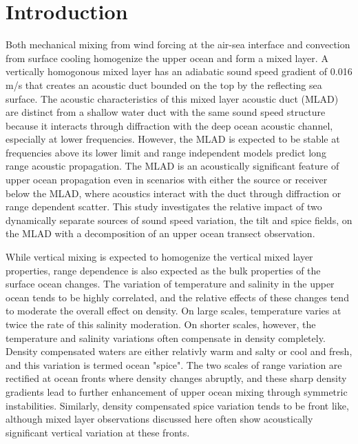 \documentclass[preprint,NumberedRefs]{JASA}
\begin{document}
\section{\label{sec:intro} Introduction}
Both mechanical mixing from wind forcing at the air-sea interface and convection from surface cooling homogenize the upper ocean and form a mixed layer\citep{cole2010seasonal}. A vertically homogonous mixed layer has an adiabatic sound speed gradient of 0.016 m/s that creates an acoustic duct bounded on the top by the reflecting sea surface. The acoustic characteristics of this mixed layer acoustic duct (MLAD) are distinct from a shallow water duct with the same sound speed structure because it interacts through diffraction with the deep ocean acoustic channel\citep{porter93}, especially at lower frequencies. However, the MLAD is expected to be stable at frequencies above its lower limit\citep{Urick1982Prop} and range independent models predict long range acoustic propagation. The MLAD is an acoustically significant feature of upper ocean propagation even in scenarios with either the source or receiver below the MLAD, where acoustics interact with the duct through diffraction or range dependent scatter\citep{colosi21}. This study investigates the relative impact of two dynamically separate sources of sound speed variation, the tilt and spice fields, on the MLAD with a decomposition of an upper ocean transect observation.

While vertical mixing is expected to homogenize the vertical mixed layer properties, range dependence is also expected as the bulk properties of the surface ocean changes\citep{ferrari2000}. The variation of temperature and salinity in the upper ocean tends to be highly correlated, and the relative effects of these changes tend to moderate the overall effect on density. On large scales, temperature varies at twice the rate of this salinity moderation. On shorter scales, however, the temperature and salinity variations often compensate in density completely. Density compensated waters are either relativly warm and salty or cool and fresh, and this variation is termed ocean "spice"\citep{munk1981evolution}. The two scales of range variation are rectified at ocean fronts where density changes abruptly, and these sharp density gradients lead to further enhancement of upper ocean mixing through symmetric instabilities\citep{dasaro2011}. Similarly, density compensated spice variation tends to be front like, although mixed layer observations discussed here often show acoustically significant vertical variation at these fronts.
\end{document}
